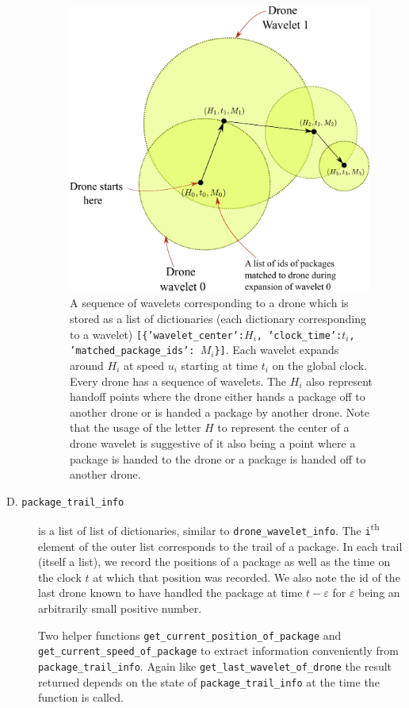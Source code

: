 \documentclass[10pt, english, oneside]{report}
\newcommand{\tss}{\textsuperscript}
\begin{document}
\begin{description}
\begin{figure}[H]
\centering
\includegraphics[width=10cm]{docs/wavelet_dict.pdf}
\caption{A sequence of wavelets corresponding to a drone which is stored as a list of dictionaries 
(each dictionary corresponding to a wavelet) 
\texttt{[\{'wavelet\_center':$H_i$, 'clock\_time':$t_i$, 'matched\_package\_ids': $M_i$\}]}.
 Each wavelet expands around $H_i$ at speed $u_i$
 starting at time $t_i$ on the global clock. Every drone has a sequence of wavelets. The $H_i$ also represent 
 handoff points where the drone either hands a package off to another drone or is handed a package by another 
 drone. Note that the usage of the letter $H$ to represent the center of
     a drone wavelet is suggestive of it also being a point where a package is handed to 
     the drone or a package is handed off to another drone.}
\end{figure}
\label{fig:wavelet_dict}


\item[D. \texttt{package\_trail\_info}]  is a list of list of dictionaries, similar to \verb|drone_wavelet_info|.  
     The \verb|i|\tss{th} element of the outer list corresponds to the trail of a package. In each trail (itself a list), we 
     record the positions of a package as well as the time on the clock $t$ at which that position was recorded. 
     We also note the id of the last drone known to have handled the package at time $t - \varepsilon$ for 
     $\varepsilon$ being an arbitrarily small positive number. 

     Two helper functions \verb|get_current_position_of_package| and \verb|get_current_speed_of_package| to extract 
     information conveniently from \verb|package_trail_info|. Again like \verb|get_last_wavelet_of_drone| the 
     result returned depends on the state of \verb|package_trail_info| at the time the function is called. 

\end{description}
\end{document}
